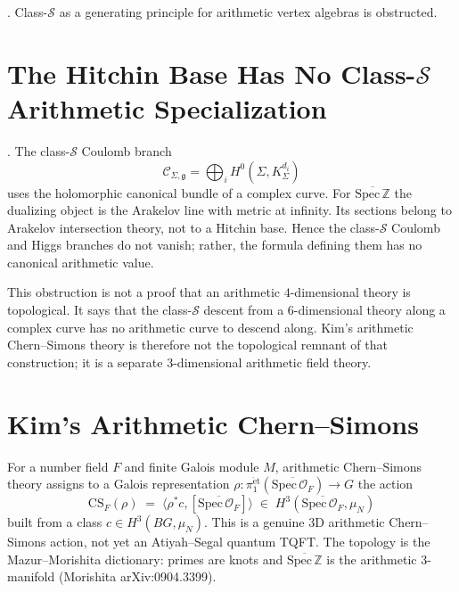 \begin{corollary}
\label{v4-arith:cor:class-S-falsified}
\ClaimStatusProvedHere. Class-\(\mathcal{S}\) as a generating
principle for arithmetic vertex algebras is obstructed.
\end{corollary}

\section{The Hitchin Base Has No Class-\(\mathcal S\) Arithmetic Specialization}
\label{v4-arith:ga:CH-vanish}

\begin{theorem}
\label{v4-arith:thm:arith-branch-vanishing}
\ClaimStatusProvedHere. The class-\(\mathcal S\) Coulomb branch
\[
\mathcal C_{\Sigma,\mathfrak g}=\bigoplus_i
H^0(\Sigma,K_\Sigma^{d_i})
\]
uses the holomorphic canonical bundle of a complex curve. For
\(\overline{\mathrm{Spec}\,\mathbb Z}\) the dualizing object is the
Arakelov line with metric at infinity. Its sections belong to
Arakelov intersection theory, not to a Hitchin base. Hence the
class-\(\mathcal S\) Coulomb and Higgs branches do not vanish; rather,
the formula defining them has no canonical arithmetic value.
\end{theorem}

\begin{remark}
This obstruction is not a proof that an arithmetic \(4\)-dimensional
theory is topological. It says that the class-\(\mathcal S\) descent
from a \(6\)-dimensional theory along a complex curve has no
arithmetic curve to descend along. Kim's arithmetic Chern--Simons
theory is therefore not the topological remnant of that construction;
it is a separate \(3\)-dimensional arithmetic field theory.
\end{remark}

\section{Kim's Arithmetic Chern--Simons}
\label{v4-arith:ga:kim-ACS}

\begin{definition}
\label{v4-arith:def:kim-ACS}
For a number field \(F\) and finite Galois module \(M\), arithmetic
Chern--Simons theory assigns to a Galois representation
\(\rho\colon\pi_{1}^{\mathrm{\acute{e}t}}(\overline{\mathrm{Spec}\,\mathcal{O}_{F}})\to G\)
the action
\begin{equation}
\mathrm{CS}_{F}(\rho)\;=\;\langle\rho^{*}c,[\overline{\mathrm{Spec}\,\mathcal{O}_{F}}]\rangle\;\in\;H^{3}(\overline{\mathrm{Spec}\,\mathcal{O}_{F}},\mu_{N})
\end{equation}
built from a class \(c\in H^{3}(BG,\mu_{N})\). This is a genuine 3D
arithmetic Chern--Simons action, not yet an Atiyah--Segal quantum
TQFT. The topology is the Mazur--Morishita dictionary: primes are
knots and \(\overline{\mathrm{Spec}\,\mathbb{Z}}\) is the arithmetic
3-manifold (Morishita arXiv:0904.3399).
\end{definition}


